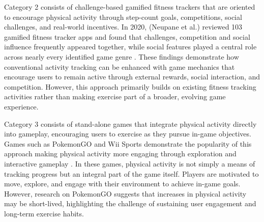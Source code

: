 \documentclass[11pt]{article}
\begin{document}
Category 2 consists of challenge-based gamified fitness trackers that are oriented to encourage physical
activity through step-count goals, competitions, social challenges, and real-world incentives. In 2020, (Neupane et al.)
reviewed 103 gamified fitness tracker apps and found that challenges, competition and social influence frequently
appeared together, while social features played a central role across nearly every identified game genre \cite{neupane2020review}.
These findings demonstrate how conventional activity tracking can be enhanced with game mechanics that encourage
users to remain active through external rewards, social interaction, and competition. However, this approach primarily
builds on existing fitness tracking activities rather than making exercise part of a broader, evolving game experience.

Category 3 consists of stand-alone games that integrate physical activity directly into gameplay, encouraging
users to exercise as they pursue in-game objectives. Games such as PokemonGO and Wii Sports demonstrate the popularity
of this approach making physical activity more engaging through exploration and interactive gameplay \cite{koh2026motivational, yim2007using}.
In these games, physical activity is not simply a means of tracking progress but an integral part of the game itself. Players are motivated to move, explore, and engage with their environment to achieve in-game goals.
However, research on PokemonGO suggests that increases in physical activity may be short-lived, highlighting the challenge
of sustaining user engagement and long-term exercise habits.
\end{document}

